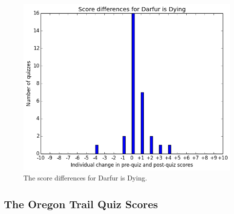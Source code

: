 			\begin{figure}[] 
			\centering 
			\includegraphics[width=\textwidth]{darfur_results.png} 
			\caption{The score differences for Darfur is Dying.}
			\end{figure}

			\clearpage

		\subsection{The Oregon Trail Quiz Scores}		

